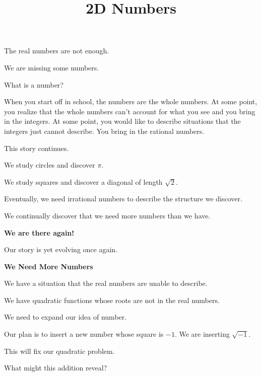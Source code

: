 \documentclass{ximera}
\title{2D Numbers}
\begin{document}
\begin{abstract}
\end{abstract}
\maketitle





The real numbers are not enough. 


We are missing some numbers. 


What is a number? 


When you start off in school, the numbers are the whole numbers.  At some point, you realize that the whole numbers can't account for what you see and you bring in the integers.  At some point, you would like to describe situations that the integers just cannot describe.  You bring in the rational numbers. 


This story continues.

We study circles and discover $\pi$.

We study squares and discover a diagonal of length $\sqrt{2}$.


Eventually, we need irrational numbers to describe the structure we discover.


We continually discover that we need more numbers than we have. 


\begin{center}
\textbf{\textcolor{red!70!darkgray}{We are there again!}}
\end{center}


Our story is yet evolving once again.


\begin{explanation} \textbf{\textcolor{red!75!green}{We Need More Numbers}} 

We have a situation that the real numbers are unable to describe.


We have quadratic functions whose roots are not in the real numbers.  


We need to expand our idea of number.

\end{explanation}



Our plan is to insert a new number whose square is $-1$.  We are inserting $\sqrt{-1}$.  


This will fix our quadratic problem. 


What might this addition reveal?
\end{document}
